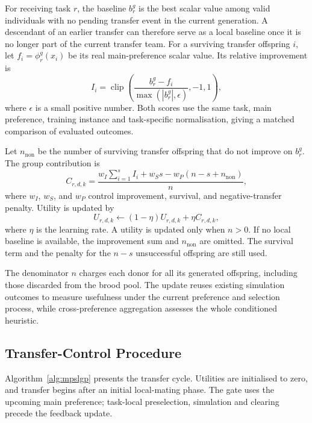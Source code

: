 \documentclass[10pt,journal]{IEEEtran}
\begin{document}
For receiving task $r$, the baseline $b_r^g$ is the best scalar value among valid individuals with no pending transfer event in the current generation. A descendant of an earlier transfer can therefore serve as a local baseline once it is no longer part of the current transfer team. For a surviving transfer offspring $i$, let $f_i=\phi_r^g(x_i)$ be its real main-preference scalar value. Its relative improvement is
\begin{equation}
 I_i=\operatorname{clip}\left(
 \frac{b_r^g-f_i}{\max(|b_r^g|,\epsilon)},-1,1\right),
 \label{eq:improvement}
\end{equation}
where $\epsilon$ is a small positive number. Both scores use the same task, main preference, training instance and task-specific normalisation, giving a matched comparison of evaluated outcomes.

Let $n_{\mathrm{non}}$ be the number of surviving transfer offspring that do not improve on $b_r^g$. The group contribution is
\begin{equation}
 C_{r,d,k}=
 \frac{w_I\sum_{i=1}^{s}I_i+w_S s-w_P(n-s+n_{\mathrm{non}})}{n},
 \label{eq:contribution}
\end{equation}
where $w_I$, $w_S$, and $w_P$ control improvement, survival, and negative-transfer penalty. Utility is updated by
\begin{equation}
 U_{r,d,k}\leftarrow(1-\eta)U_{r,d,k}+\eta C_{r,d,k},
 \label{eq:update}
\end{equation}
where $\eta$ is the learning rate. A utility is updated only when $n>0$. If no local baseline is available, the improvement sum and $n_{\mathrm{non}}$ are omitted. The survival term and the penalty for the $n-s$ unsuccessful offspring are still used.

The denominator $n$ charges each donor for all its generated offspring, including those discarded from the brood pool. The update reuses existing simulation outcomes to measure usefulness under the current preference and selection process, while cross-preference aggregation assesses the whole conditioned heuristic.

\subsection{Transfer-Control Procedure}
Algorithm~\ref{alg:mpslgp} presents the transfer cycle. Utilities are initialised to zero, and transfer begins after an initial local-mating phase. The gate uses the upcoming main preference; task-local preselection, simulation and clearing precede the feedback update.
\end{document}
